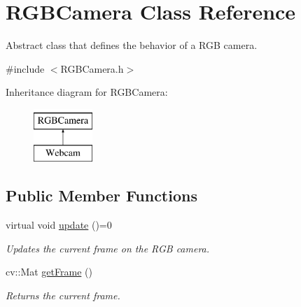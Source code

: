 \hypertarget{class_r_g_b_camera}{}\section{R\+G\+B\+Camera Class Reference}
\label{class_r_g_b_camera}


Abstract class that defines the behavior of a R\+GB camera.  




{\ttfamily \#include $<$R\+G\+B\+Camera.\+h$>$}

Inheritance diagram for R\+G\+B\+Camera\+:\begin{figure}[H]
\begin{center}
\leavevmode
\includegraphics[height=2.000000cm]{class_r_g_b_camera}
\end{center}
\end{figure}
\subsection*{Public Member Functions}
\begin{DoxyCompactItemize}
\item 
virtual void \hyperlink{class_r_g_b_camera_ac9fa3f8f32605e846827b694ae7cff18}{update} ()=0
\begin{DoxyCompactList}\small\item\em Updates the current frame on the R\+GB camera. \end{DoxyCompactList}\item 
cv\+::\+Mat \hyperlink{class_r_g_b_camera_a4db0620e9346039530f248fbb7130212}{get\+Frame} ()
\begin{DoxyCompactList}\small\item\em Returns the current frame. \end{DoxyCompactList}\end{DoxyCompactItemize}
